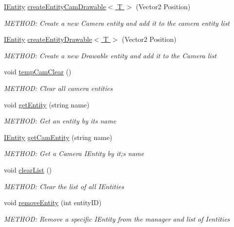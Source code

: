 \begin{DoxyCompactItemize}
\hyperlink{a00438}{I\+Entity} \hyperlink{a00518_a89ca1b1834aff0dc1d2c6ec95dcd0793}{create\+Entity\+Cam\+Drawable$<$ T $>$} (Vector2 Position)
\begin{DoxyCompactList}\small\item\em M\+E\+T\+H\+OD\+: Create a new Camera entity and add it to the camera entity list \end{DoxyCompactList}\item 
\hyperlink{a00438}{I\+Entity} \hyperlink{a00518_a787212a79eb20bd2c695783b5f802347}{create\+Entity\+Drawable$<$ T $>$} (Vector2 Position)
\begin{DoxyCompactList}\small\item\em M\+E\+T\+H\+OD\+: Create a new Drawable entity and add it to the Camera list \end{DoxyCompactList}\item 
void \hyperlink{a00518_a960c2ec6b45bbbd4f0030b04f90dc407}{temp\+Cam\+Clear} ()
\begin{DoxyCompactList}\small\item\em M\+E\+T\+H\+OD\+: Clear all camera entities \end{DoxyCompactList}\item 
void \hyperlink{a00518_abeffd88412f79249f333944b45486dff}{get\+Entity} (string name)
\begin{DoxyCompactList}\small\item\em M\+E\+T\+H\+OD\+: Get an entity by it\textquotesingle{}s name \end{DoxyCompactList}\item 
\hyperlink{a00438}{I\+Entity} \hyperlink{a00518_ab3ff805a060af38748444e520995d8fa}{get\+Cam\+Entity} (string name)
\begin{DoxyCompactList}\small\item\em M\+E\+T\+H\+OD\+: Get a Camera I\+Entity by it;s name \end{DoxyCompactList}\item 
void \hyperlink{a00518_a4eff29b463061f602be758bd3d36ef25}{clear\+List} ()
\begin{DoxyCompactList}\small\item\em M\+E\+T\+H\+OD\+: Clear the list of all I\+Entities \end{DoxyCompactList}\item 
void \hyperlink{a00518_a1d9ffc3b80cc8633265fe1f7e51c6122}{remove\+Entity} (int entity\+ID)
\begin{DoxyCompactList}\small\item\em M\+E\+T\+H\+OD\+: Remove a specific I\+Entity from the manager and list of Ientities \end{DoxyCompactList}\item 

\end{DoxyCompactItemize}
